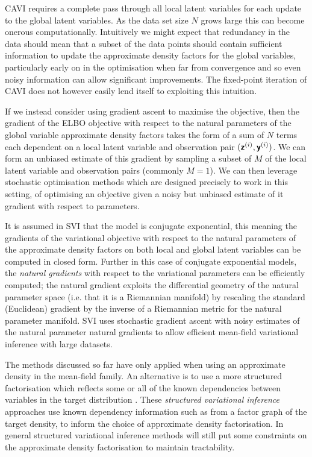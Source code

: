 \ac{CAVI} requires a complete pass through all local latent variables for each update to the global latent variables. As the data set size $N$ grows large this can become onerous computationally. Intuitively we might expect that redundancy in the data should mean that a subset of the data points should contain sufficient information to update the approximate density factors for the global variables, particularly early on in the optimisation when far from convergence and so even noisy information can allow significant improvements. The fixed-point iteration of \ac{CAVI} does not however easily lend itself to exploiting this intuition.

If we instead consider using gradient ascent to maximise the objective, then the gradient of the \ac{ELBO} objective with respect to the natural parameters of the global variable approximate density factors takes the form of a sum of $N$ terms each dependent on a local latent variable and observation pair $(\boldsymbol{\mathsf{z}}^{(i)}, \boldsymbol{\mathsf{y}}^{(i)})$. We can form an unbiased estimate of this gradient by sampling a subset of $M$ of the local latent variable and observation pairs (commonly $M=1$). We can then leverage stochastic optimisation methods \citep{robbins1951stochastic} which are designed precisely to work in this setting, of optimising an objective given a noisy but unbiased estimate of it gradient with respect to parameters. 

It is assumed in \ac{SVI} that the model is conjugate exponential, this meaning the gradients of the variational objective with respect to the natural parameters of the approximate density factors on both local and global latent variables can be computed in closed form. Further in this case of conjugate exponential models, the \emph{natural gradients} \citep{amari1982differential} with respect to the variational parameters can be efficiently computed; the natural gradient exploits the differential geometry of the natural parameter space (i.e. that it is a Riemannian manifold) by rescaling the standard (Euclidean) gradient by the inverse of a Riemannian metric for the natural parameter manifold. \ac{SVI} uses stochastic gradient ascent with noisy estimates of the natural parameter natural gradients to allow efficient mean-field variational inference with large datasets.  

The methods discussed so far have only applied when using an approximate density in the mean-field family. An alternative is to use a more structured factorisation which reflects some or all of the known dependencies between variables in the target distribution \citep{saul1996exploiting,barber1999tractable,storkey2000dynamic,hoffman2015structured}. These \emph{structured variational inference} approaches use known dependency information such as from a factor graph of the target density, to inform the choice of approximate density factorisation. In general structured variational inference methods will still put some constraints on the approximate density factorisation to maintain tractability. 

